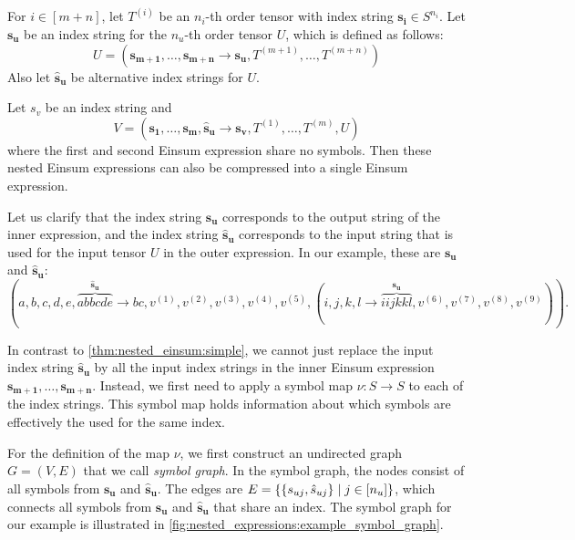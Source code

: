 \begin{theorem}
    \label{thm:nested_einsum:general}
    For $i \in [m + n]$, let $T^{(i)}$ be an $n_i$-th order tensor with index string $\bm{s_i} \in S^{n_i}$.
    Let $\bm{s_u}$ be an index string for the $n_u$-th order tensor $U$, which is defined as follows:
    $$U = (\bm{s_{m + 1}},\dots,\bm{s_{m + n}} \rightarrow \bm{s_u}, T^{(m + 1)},\dots,T^{(m + n)})$$
    Also let $\bm{\hat{s}_u}$ be alternative index strings for $U$.

    Let $s_v$ be an index string and
    $$V = (\bm{s_1},\dots,\bm{s_m}, \bm{\hat{s}_u} \rightarrow \bm{s_v}, T^{(1)},\dots,T^{(m)}, U)$$
    where the first and second Einsum expression share no symbols.
    Then these nested Einsum expressions can also be compressed into a single Einsum expression.

    Let us clarify that the index string $\bm{s_u}$ corresponds to the output string of the inner expression,
    and the index string $\bm{\hat{s}_u}$ corresponds to the input string that is used for the input tensor $U$ in the outer expression.
    In our example, these are $\bm{s_u}$ and $\bm{\hat{s}_u}$:
    $$(a,b,c,d,e,\overbrace{abbcde}^{\bm{\hat{s}_u}} \rightarrow bc, v^{(1)}, v^{(2)}, v^{(3)}, v^{(4)}, v^{(5)}, (
        i,j,k,l \rightarrow \overbrace{iijkkl}^{\bm{s_u}}, v^{(6)}, v^{(7)}, v^{(8)}, v^{(9)}
        )).$$

    In contrast to \cref{thm:nested_einsum:simple}, we cannot just replace the input index string $\bm{\hat{s}_u}$ by all the input index strings in the inner Einsum expression $\bm{s_{m + 1}},\dots,\bm{s_{m + n}}$.
    Instead, we first need to apply a symbol map $\nu: S \rightarrow S$ to each of the index strings.
    This symbol map holds information about which symbols are effectively the used for the same index.

    For the definition of the map $\nu$, we first construct an undirected graph $G = (V, E)$ that we call \textit{symbol graph}.
    In the symbol graph, the nodes consist of all symbols from $\bm{s_u}$ and $\bm{\hat{s}_u}$.
    The edges are $E = \smallset{\smallset{s_{uj}, \hat{s}_{uj}} \mid j \in [n_u]}$,
    which connects all symbols from $\bm{s_u}$ and $\bm{\hat{s}_u}$ that share an index.
    The symbol graph for our example is illustrated in \cref{fig:nested_expressions:example_symbol_graph}.

    \begin{figure}[h]
        \centering
        \begin{tikzpicture}[node distance = 2cm, semithick]


\end{tikzpicture}
\end{figure}
\end{theorem}
